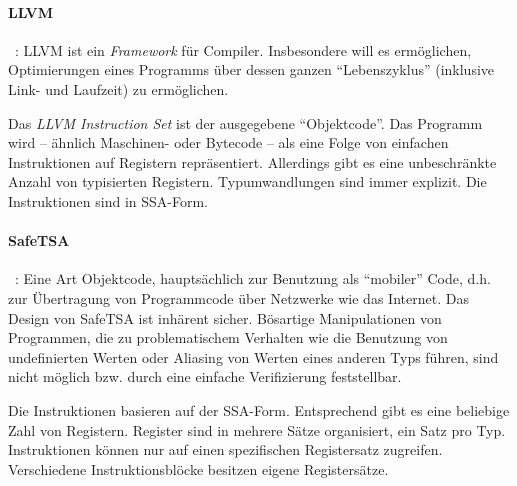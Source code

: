 \documentclass[twoside,a4paper,fleqn,12pt]{book}
\begin{document}

\paragraph{LLVM}~\cite{LLVM:CGO04}: LLVM ist ein \emph{Framework} für Compiler. Insbesondere will es ermöglichen, Optimierungen
eines Programms über dessen ganzen "`Lebenszyklus"' (inklusive Link- und Laufzeit) zu ermöglichen.

Das \emph{LLVM Instruction Set} ist der ausgegebene "`Objektcode"'. Das Programm wird -- ähnlich Maschinen-
oder Bytecode -- als eine Folge von einfachen Instruktionen auf Registern repräsentiert. 
Allerdings gibt es eine unbeschränkte Anzahl von typisierten Registern. Typumwandlungen sind immer explizit.
Die Instruktionen sind in SSA-Form.



\paragraph{SafeTSA}~\cite{SafeTSA}: Eine Art Objektcode, hauptsächlich zur Benutzung
als "`mobiler"' Code, d.h. zur Übertragung von Programmcode über Netzwerke wie das Internet.
Das Design von SafeTSA ist inhärent sicher. Bösartige Manipulationen von Programmen, die zu
problematischem Verhalten wie die Benutzung von undefinierten Werten oder Aliasing von Werten
eines anderen Typs führen, sind nicht möglich bzw. durch eine einfache Verifizierung feststellbar.

Die Instruktionen basieren auf der SSA-Form. Entsprechend gibt es eine beliebige Zahl von Registern.
Register sind in mehrere Sätze organisiert, ein Satz pro Typ. Instruktionen können nur auf einen
spezifischen Registersatz zugreifen. Verschiedene Instruktionsblöcke besitzen eigene Registersätze.
\end{document}
